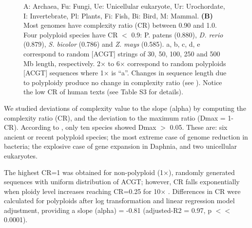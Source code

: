 \begin{figure}[htpb]
{A: Archaea, Fu: Fungi, Ue: Unicellular eukaryote, Ur: Urochordate, I: Invertebrate, Pl: Plants, Fi: Fish, Bi: Bird, M: Mammal. \textbf{(B)} Most genomes have complexity ratio (CR) between 0.90 and 1.0. Four polyploid species have CR $<$ 0.9: P. patens (0.880), \textit{D. rerio} (0.879), \textit{S. bicolor} (0.786) and \textit{Z. mays} (0.585). a, b, c, d, e correspond to random [ACGT] strings of 30, 50, 100, 250 and 500 Mb length, respectively. 2$\times$ to 6$\times$ correspond to random polyploids [ACGT] sequences where 1$\times$ is ``a''. Changes in sequence length due to polyploidy produce no change in complexity ratio (see ). Notice the low CR of human texts (see Table S3 for details).
}
\label{fig:gen_compl}
\end{figure}

We studied deviations of complexity value to the slope (alpha) by computing the complexity ratio (CR), and the deviation to the maximum ratio (Dmax = 1- CR). According to , only ten species showed Dmax $>$ 0.05. These are: six ancient or recent polyploid species; the most extreme case of genome reduction in bacteria; the explosive case of gene expansion in Daphnia, and two unicellular eukaryotes.

The highest CR=1 was obtained for non-polyploid (1$\times$), randomly generated sequences with uniform distribution of ACGT; however, CR falls exponentially when ploidy level increases reaching CR=0.25 for 10$\times$ . Differences in CR were calculated for polyploids after log transformation and linear regression model adjustment, providing a slope (alpha) = -0.81 (adjusted-R2 = 0.97, p $<<$ 0.0001). 

